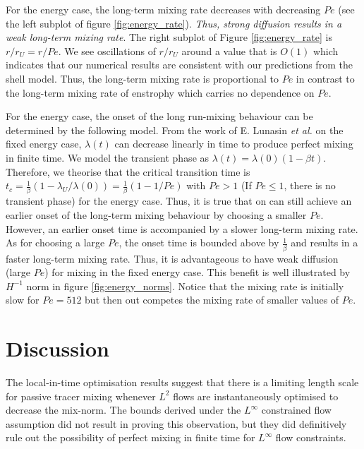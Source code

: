 \documentclass[12pt]{iopart}
\begin{document}
For the energy case, the long-term mixing rate decreases with decreasing $Pe$ (see the left subplot of figure \ref{fig:energy_rate}).  {\it Thus, strong diffusion results in a weak long-term mixing rate}. The right subplot of Figure \ref{fig:energy_rate} is $r/r_{U} =  r/Pe$. We see oscillations of $r/r_{U}$ around a value that is $O(1)$ which indicates that our numerical results are consistent with our predictions from the shell model. Thus, the long-term mixing rate is proportional to $Pe$ in contrast to the long-term mixing rate of enstrophy which carries no dependence on $Pe$.

For the energy case, the onset of the long run-mixing behaviour can be determined by the following model. From the work of E. Lunasin {\it et al.} \cite{JMP2012} on the fixed energy case, $\lambda(t)$ can decrease linearly in time to produce perfect mixing in finite time. We model the transient phase as $\lambda(t)=\lambda(0)(1-\beta t)$. Therefore, we theorise that the critical transition time is $t_{c}=\frac{1}{\beta}(1 -\lambda_{U}/\lambda(0)) = \frac{1}{\beta}(1 - 1/Pe)$ with $Pe> 1$ (If $Pe \leq 1$, there is no transient phase) for the energy case. Thus, it is true that on can still achieve an earlier onset of the long-term mixing behaviour by choosing a smaller $Pe$. However, an earlier onset time is accompanied by a slower long-term mixing rate. As for choosing a large $Pe$, the onset time is bounded above by $\frac{1}{\beta}$ and results in a faster long-term mixing rate. Thus, it is advantageous to have weak diffusion (large $Pe$) for mixing in the fixed energy case. This benefit is well illustrated by $H^{-1}$ norm in figure \ref{fig:energy_norms}. Notice that the mixing rate is initially slow for $Pe = 512$ but then out competes the mixing rate of smaller values of $Pe$.    


\section{Discussion}
\label{sec:discussion}
%
The local-in-time optimisation results suggest that there is a limiting length scale for passive tracer mixing whenever $L^{2}$ flows are instantaneously optimised to decrease the mix-norm. The bounds derived under the $L^{\infty}$ constrained flow assumption did not result in proving this observation, but they did definitively rule out the possibility of perfect mixing in finite time for $L^{\infty}$ flow constraints. 
\end{document}
